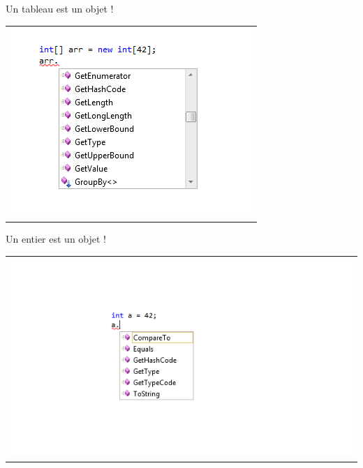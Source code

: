 \documentclass{beamer}
\begin{document}
\begin{frame}[fragile]
Un tableau est un objet !
        \begin{tabular}{c}\includegraphics[scale=0.8]{images/array_methods.png}\end{tabular} 
\end{frame}

\begin{frame}[fragile]
Un entier est un objet !
        \begin{tabular}{c}\includegraphics[scale=0.8]{images/int_methods.png}\end{tabular} 
\end{frame}
\end{document}
